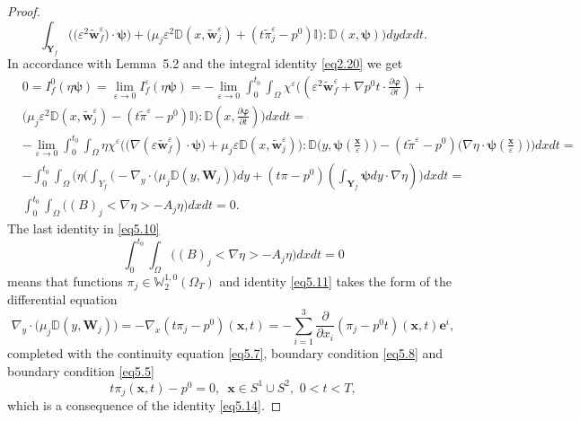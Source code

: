 \documentclass[10pt,a4paper]{amsart}
\begin{document}
\begin{proof}
\begin{equation*}
\int_{\textbf{Y}_{f}}\Big(\big(\varepsilon^{2}
\widetilde{\boldsymbol{w}}_{f}^{\varepsilon})\cdot\boldsymbol{\psi}\big)+
\big(\mu_{j}\varepsilon^{2}\mathbb{D}(x,\widetilde{\boldsymbol{w}}_{j}^{\varepsilon})+
(t\widetilde{{\pi}}^{\varepsilon}_{j}-{p}^{0})\mathbb{I}\big):\mathbb{D}(x,\boldsymbol{\psi})\Big)dydxdt.
\end{equation*}
In accordance with Lemma~5.2 and the integral identity \eqref{eq2.20} we get
\begin{equation}\label{eq5.10}
\begin{aligned}
& 
0={I}^{0}_{f}(\eta\boldsymbol{\psi})=
\lim_{\varepsilon\rightarrow{0}}I^{\varepsilon}_{f}(\eta\boldsymbol{\psi})=
-\lim_{\varepsilon\rightarrow{0}}\int_{0}^{t_{0}}\int_{\Omega}\chi^{\varepsilon}
\Big((\varepsilon^{2}\widetilde{\boldsymbol{w}}_{f}^{\varepsilon}+\nabla{p}^{0}t\cdot
\frac{\partial\boldsymbol{\varphi}}{\partial{t}})+
\\
& \big(\mu_{j}\varepsilon^{2}\mathbb{D}(x,\widetilde{\boldsymbol{w}}_{j}^{\varepsilon})-
(t\widetilde{{\pi}}^{\varepsilon}-{p}^{0})\mathbb{I}\big):
\mathbb{D}(x,\frac{\partial\boldsymbol{\varphi}}{\partial{t}})\Big)dxdt=
\\
& -\lim_{\varepsilon\rightarrow{0}}\int_{0}^{t_{0}}\int_{\Omega}\eta\chi^{\varepsilon}
\Big(\big(\nabla(\varepsilon\widetilde{\boldsymbol{w}}_{f}^{\varepsilon})\cdot\boldsymbol{\psi}\big)+
\mu_{j}\varepsilon\mathbb{D}(x,\widetilde{\boldsymbol{w}}_{j}^{\varepsilon})\big):
\mathbb{D}\big(y,\boldsymbol{\psi}(\frac{\boldsymbol{x}}{\varepsilon})\big)-
(t\widetilde{{\pi}}^{\varepsilon}-{p}^{0})\big(\nabla\eta\cdot
\boldsymbol{\psi}(\frac{\boldsymbol{x}}{\varepsilon})\big)\Big)dxdt=
\\
& -\int_{0}^{t_{0}}\int_{\Omega}\Big(\eta\big(\int_{Y_{f}}\big(-\nabla_{y}\cdot
\big(\mu_{j}\mathbb{D}(y,\boldsymbol{W}_{j})
\big)dy+(t{\pi}-{p}^{0})(\int_{\textbf{Y}_{f}}\boldsymbol{\psi}dy\cdot\nabla\eta)\Big)dxdt=
\\
& \int_{0}^{t_{0}}\int_{\Omega}\big((B)_{j}<\nabla\eta>-A_{j}\eta\big)dxdt=0.
\end{aligned}
\end{equation}
The last identity in \eqref{eq5.10}
\begin{equation}\label{eq5.11}
\int_{0}^{t_{0}}\int_{\Omega}\big((B)_{j}<\nabla\eta>-A_{j}\eta\big)dxdt=0
\end{equation}
means that functions ${\pi}_{j}\in\mathbb{W}^{1,0}_{2}(\Omega_{T})$ and identity
\eqref{eq5.11} takes the form of the differential equation
\begin{equation}\label{eq5.12}
\nabla_{y}\cdot\big(\mu_{j}\mathbb{D}(y,\boldsymbol{W}_{j})\big)=
-\nabla_{x}(t\pi_{j}-{p}^{0})(\boldsymbol{x},t)=
-\sum_{i=1}^{3}\frac{\partial{}}{\partial{x_{i}}}({\pi}_{j}-{p}^{0}t)(\boldsymbol{x},t)\boldsymbol{e}^{i},
\end{equation}
completed with the continuity equation \eqref{eq5.7}, boundary condition \eqref{eq5.8} and boundary condition \eqref{eq5.5}
\begin{equation}\label{eq5.13}
t\pi_{j}(\boldsymbol{x},t)-{p}^{0}=0,\,\,\,\boldsymbol{x}\in{S}^{1}\cup{S}^{2},\,\,0<t<T,
\end{equation}
which is a consequence of the identity \eqref{eq5.14}.


\end{proof}
\end{document}
